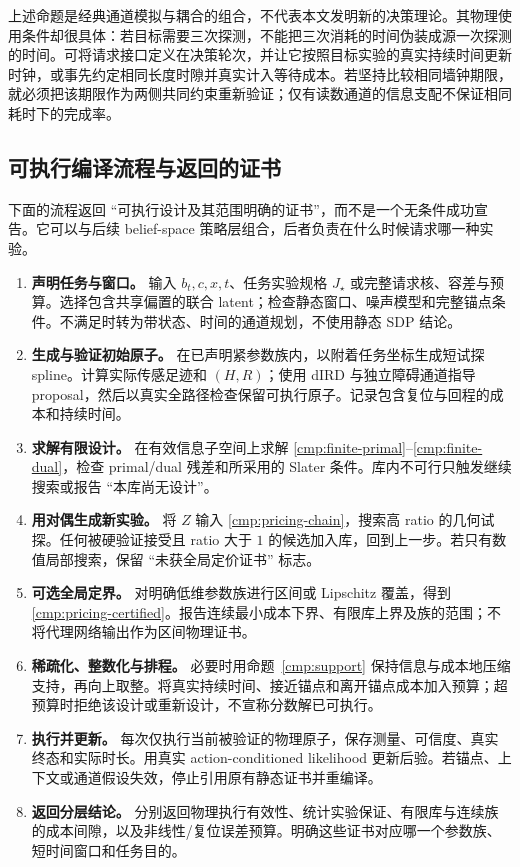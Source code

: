 \documentclass[11pt,a4paper]{article}
\numberwithin{equation}{section}
\theoremstyle{definition}
\begin{document}
上述命题是经典通道模拟与耦合的组合，不代表本文发明新的决策理论。其物理使用条件却很具体：若目标需要三次探测，不能把三次消耗的时间伪装成源一次探测的时间。可将请求接口定义在决策轮次，并让它按照目标实验的真实持续时间更新时钟，或事先约定相同长度时隙并真实计入等待成本。若坚持比较相同墙钟期限，就必须把该期限作为两侧共同约束重新验证；仅有读数通道的信息支配不保证相同耗时下的完成率。

\subsection{可执行编译流程与返回的证书}
\label{cmp:algorithm}

下面的流程返回 ``可执行设计及其范围明确的证书''，而不是一个无条件成功宣告。它可以与后续 belief-space 策略层组合，后者负责在什么时候请求哪一种实验。

\begin{enumerate}
 \item \textbf{声明任务与窗口。} 输入 $b_t,c,x,t$、任务实验规格 $J_\star$ 或完整请求核、容差与预算。选择包含共享偏置的联合 latent；检查静态窗口、噪声模型和完整锚点条件。不满足时转为带状态、时间的通道规划，不使用静态 SDP 结论。
 \item \textbf{生成与验证初始原子。} 在已声明紧参数族内，以附着任务坐标生成短试探 spline。计算实际传感足迹和 $(H,R)$；使用 dIRD 与独立障碍通道指导 proposal，然后以真实全路径检查保留可执行原子。记录包含复位与回程的成本和持续时间。
 \item \textbf{求解有限设计。} 在有效信息子空间上求解 \eqref{cmp:finite-primal}--\eqref{cmp:finite-dual}，检查 primal/dual 残差和所采用的 Slater 条件。库内不可行只触发继续搜索或报告 ``本库尚无设计''。
 \item \textbf{用对偶生成新实验。} 将 $Z$ 输入 \eqref{cmp:pricing-chain}，搜索高 ratio 的几何试探。任何被硬验证接受且 ratio 大于 $1$ 的候选加入库，回到上一步。若只有数值局部搜索，保留 ``未获全局定价证书'' 标志。
 \item \textbf{可选全局定界。} 对明确低维参数族进行区间或 Lipschitz 覆盖，得到 \eqref{cmp:pricing-certified}。报告连续最小成本下界、有限库上界及族的范围；不将代理网络输出作为区间物理证书。
 \item \textbf{稀疏化、整数化与排程。} 必要时用命题~\ref{cmp:support} 保持信息与成本地压缩支持，再向上取整。将真实持续时间、接近锚点和离开锚点成本加入预算；超预算时拒绝该设计或重新设计，不宣称分数解已可执行。
 \item \textbf{执行并更新。} 每次仅执行当前被验证的物理原子，保存测量、可信度、真实终态和实际时长。用真实 action-conditioned likelihood 更新后验。若锚点、上下文或通道假设失效，停止引用原有静态证书并重编译。
 \item \textbf{返回分层结论。} 分别返回物理执行有效性、统计实验保证、有限库与连续族的成本间隙，以及非线性/复位误差预算。明确这些证书对应哪一个参数族、短时间窗口和任务目的。
\end{enumerate}
\end{document}

